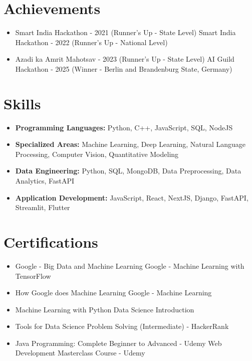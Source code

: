 \documentclass[a4paper,10pt]{article}
\begin{document}
\section*{Achievements}
\begin{itemize}
\item Smart India Hackathon - 2021 (Runner's Up - State Level) \hfill Smart India Hackathon - 2022 (Runner's Up - National Level)
\item Azadi ka Amrit Mahotsav - 2023 (Runner's Up - State Level) \hfill AI Guild Hackathon - 2025 (Winner - Berlin and Brandenburg State, Germany)
\end{itemize}

\section*{Skills}
\begin{itemize}
  \item \textbf{Programming Languages:} Python, C++, JavaScript, SQL, NodeJS
  \item \textbf{Specialized Areas:} Machine Learning, Deep Learning, Natural Language Processing, Computer Vision, Quantitative Modeling
  \item \textbf{Data Engineering:} Python, SQL, MongoDB, Data Preprocessing, Data Analytics, FastAPI
  \item \textbf{Application Development:} JavaScript, React, NextJS, Django, FastAPI, Streamlit, Flutter
\end{itemize}

\section*{Certifications}
\begin{itemize}
\item Google - Big Data and Machine Learning \hfill Google - Machine Learning with TensorFlow
\item How Google does Machine Learning \hfill Google - Machine Learning
\item Machine Learning with Python \hfill Data Science Introduction
\item Tools for Data Science \hfill Problem Solving (Intermediate) - HackerRank
\item Java Programming: Complete Beginner to Advanced - Udemy \hfill Web Development Masterclass Course - Udemy
\end{itemize}
\end{document}
